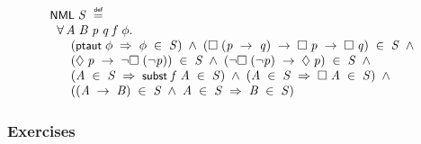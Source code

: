 \documentclass[letterpaper]{article}
\renewcommand{\HOLConst}[1]{{\textsf{\upshape\small #1}}}
\newenvironment{holmath}{\begin{displaymath}\begin{array}{l}}{\end{array}\end{displaymath}\ignorespacesafterend}
\begin{document}
\begin{holmath}
  \HOLConst{NML}\;\HOLFreeVar{S}\;\HOLSymConst{\HOLTokenDefEquality{}}\\
\;\;\HOLSymConst{\HOLTokenForall{}}\HOLBoundVar{A}\;\HOLBoundVar{B}\;\HOLBoundVar{p}\;\HOLBoundVar{q}\;\HOLBoundVar{f}\;\HOLBoundVar{\ensuremath{\phi}}.\\
\;\;\;\;\;\;(\HOLConst{ptaut}\;\HOLBoundVar{\ensuremath{\phi}}\;\HOLSymConst{\HOLTokenImp{}}\;\HOLBoundVar{\ensuremath{\phi}}\;\HOLSymConst{\HOLTokenIn{}}\;\HOLFreeVar{S})\;\HOLSymConst{\HOLTokenConj{}}\;(\HOLSymConst{\ensuremath{\Box}}\;(\HOLBoundVar{p}\;\HOLSymConst{\ensuremath{\rightarrow}}\;\HOLBoundVar{q})\;\HOLSymConst{\ensuremath{\rightarrow}}\;\HOLSymConst{\ensuremath{\Box}}\;\HOLBoundVar{p}\;\HOLSymConst{\ensuremath{\rightarrow}}\;\HOLSymConst{\ensuremath{\Box}}\;\HOLBoundVar{q})\;\HOLSymConst{\HOLTokenIn{}}\;\HOLFreeVar{S}\;\HOLSymConst{\HOLTokenConj{}}\\
\;\;\;\;\;\;(\HOLSymConst{\ensuremath{\Diamond}}\;\HOLBoundVar{p}\;\HOLSymConst{\ensuremath{\rightarrow}}\;\HOLSymConst{\HOLTokenNeg{}}\HOLSymConst{\ensuremath{\Box}}\;(\HOLSymConst{\HOLTokenNeg{}}\HOLBoundVar{p}))\;\HOLSymConst{\HOLTokenIn{}}\;\HOLFreeVar{S}\;\HOLSymConst{\HOLTokenConj{}}\;(\HOLSymConst{\HOLTokenNeg{}}\HOLSymConst{\ensuremath{\Box}}\;(\HOLSymConst{\HOLTokenNeg{}}\HOLBoundVar{p})\;\HOLSymConst{\ensuremath{\rightarrow}}\;\HOLSymConst{\ensuremath{\Diamond}}\;\HOLBoundVar{p})\;\HOLSymConst{\HOLTokenIn{}}\;\HOLFreeVar{S}\;\HOLSymConst{\HOLTokenConj{}}\\
\;\;\;\;\;\;(\HOLBoundVar{A}\;\HOLSymConst{\HOLTokenIn{}}\;\HOLFreeVar{S}\;\HOLSymConst{\HOLTokenImp{}}\;\HOLConst{subst}\;\HOLBoundVar{f}\;\HOLBoundVar{A}\;\HOLSymConst{\HOLTokenIn{}}\;\HOLFreeVar{S})\;\HOLSymConst{\HOLTokenConj{}}\;(\HOLBoundVar{A}\;\HOLSymConst{\HOLTokenIn{}}\;\HOLFreeVar{S}\;\HOLSymConst{\HOLTokenImp{}}\;\HOLSymConst{\ensuremath{\Box}}\;\HOLBoundVar{A}\;\HOLSymConst{\HOLTokenIn{}}\;\HOLFreeVar{S})\;\HOLSymConst{\HOLTokenConj{}}\\
\;\;\;\;\;\;((\HOLBoundVar{A}\;\HOLSymConst{\ensuremath{\rightarrow}}\;\HOLBoundVar{B})\;\HOLSymConst{\HOLTokenIn{}}\;\HOLFreeVar{S}\;\HOLSymConst{\HOLTokenConj{}}\;\HOLBoundVar{A}\;\HOLSymConst{\HOLTokenIn{}}\;\HOLFreeVar{S}\;\HOLSymConst{\HOLTokenImp{}}\;\HOLBoundVar{B}\;\HOLSymConst{\HOLTokenIn{}}\;\HOLFreeVar{S})
\end{holmath}

\subsubsection{Exercises}
\end{document}
